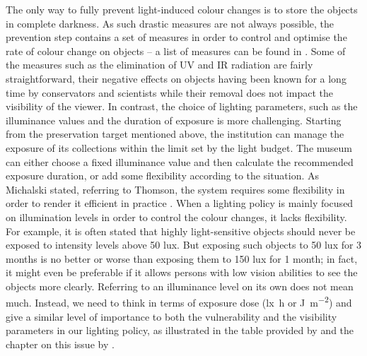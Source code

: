 The only way to fully prevent light-induced colour changes is to store the objects in complete darkness. As such drastic measures are not always possible, the prevention step contains a set of measures in order to control and optimise the rate of colour change on objects – a list of measures can be found in \citet[279, Table 10.3]{saunders_museum_2020}. Some of the measures such as the elimination of \gls{UV} and \gls{IR} radiation are fairly straightforward, their negative effects on objects having been known for a long time by conservators and scientists \citep{feller_controeffets_1964,feller_speeding_1975, padfield_control_1966} while their removal does not impact the visibility of the viewer. In contrast, the choice of lighting parameters, such as the illuminance values and the duration of exposure is more challenging. Starting from the preservation target mentioned above, the institution can manage the exposure of its collections within the limit set by the light budget. The museum can either choose a fixed illuminance value and then calculate the recommended exposure duration, or add some flexibility according to the situation. As Michalski stated, referring to Thomson, the system requires some flexibility in order to render it efficient in practice \citep[97]{michalski_lighting_1997}. When a lighting policy is mainly focused on illumination levels in order to control the colour changes, it lacks flexibility. For example, it is often stated that highly light-sensitive objects should never be exposed to intensity levels above 50 lux. But exposing such objects to 50 lux for 3 months is no better or worse than exposing them to 150 lux for 1 month; in fact, it might even be preferable if it allows persons with low vision abilities to see the objects more clearly. Referring to an illuminance level on its own does not mean much. Instead, we need to think in terms of exposure dose (\unit{\lux\hour} or \unit{\joule\per\square\metre}) and give a similar level of importance to both the vulnerability and the visibility parameters in our lighting policy, as illustrated in the table provided by \citet[Table 1]{michalski_lighting_1997} and the chapter on this issue by \citet[Chapter 10]{saunders_museum_2020}. \\

